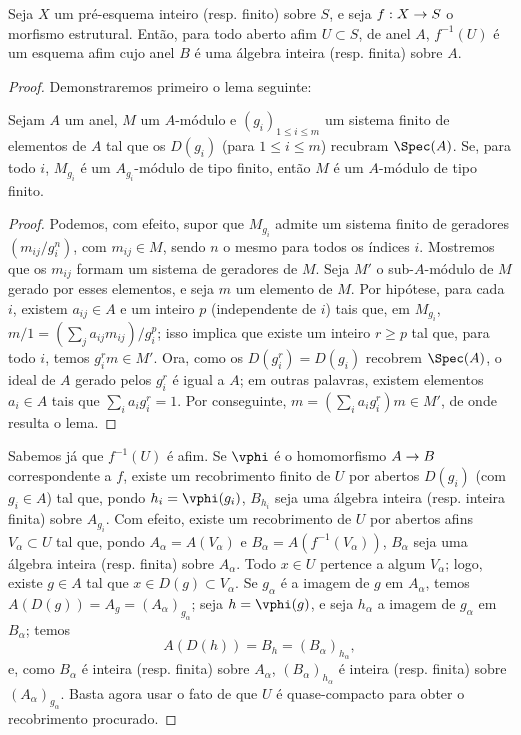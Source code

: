 \documentclass[oneside,10pt]{amsart}
\makeatletter
\renewcommand{\leq}{\leqslant}
\renewcommand{\geq}{\geqslant}
\newcommand{\ega@arrow}[2]{\mathchoice{#1}{#2}{#2}{#2}}
\renewcommand{\to}{\ega@arrow{\longrightarrow}{\rightarrow}}
\newcommand{\oldpage}[2][]{\marginnote{\normalfont\footnotesize\textbf{#1}~|~#2}\ignorespaces}
\let\EGAOriginalLabel\label
\renewcommand{\label}[1]{\phantomsection\EGAOriginalLabel{#1}}
\makeatother
\begin{document}
\begin{proposition}[6.1.4]
\label{II.6.1.4}
Seja $X$ um pré-esquema inteiro (resp. finito) sobre $S$, e seja $f:X\to S$ o morfismo estrutural.
Então, para todo aberto afim $U\subset S$, de anel $A$, $f^{-1}(U)$ é um esquema afim cujo anel $B$ é uma álgebra inteira (resp. finita) sobre $A$.
\end{proposition}
\oldpage[II]{111}
\begin{proof}
Demonstraremos primeiro o lema seguinte:

  \begin{lemma}[6.1.4.1]
  \label{II.6.1.4.1}
  Sejam $A$ um anel, $M$ um $A$-módulo e $(g_i)_{1\leq i\leq m}$ um sistema finito de elementos de $A$ tal que os $D(g_i)$ (para $1\leq i\leq m$) recubram $\Spec(A)$.
  Se, para todo $i$, $M_{g_i}$ é um $A_{g_i}$-módulo de tipo finito, então $M$ é um $A$-módulo de tipo finito.
  \end{lemma}

  \begin{proof}
  Podemos, com efeito, supor que $M_{g_i}$ admite um sistema finito de geradores $(m_{ij}/g_i^n)$, com $m_{ij}\in M$, sendo $n$ o mesmo para todos os índices $i$.
  Mostremos que os $m_{ij}$ formam um sistema de geradores de $M$.
  Seja $M'$ o sub-$A$-módulo de $M$ gerado por esses elementos, e seja $m$ um elemento de $M$.
  Por hipótese, para cada $i$, existem $a_{ij}\in A$ e um inteiro $p$ (independente de $i$) tais que, em $M_{g_i}$, $m/1=(\sum_j a_{ij}m_{ij})/g_i^p$;
  isso implica que existe um inteiro $r\geq p$ tal que, para todo $i$, temos $g_i^rm\in M'$.
  Ora, como os $D(g_i^r)=D(g_i)$ recobrem $\Spec(A)$, o ideal de $A$ gerado pelos $g_i^r$ é igual a $A$; em outras palavras, existem elementos $a_i\in A$ tais que $\sum_i a_ig_i^r=1$.
  Por conseguinte, $m=(\sum_i a_i g_i^r)m\in M'$, de onde resulta o lema.
  \end{proof}

Sabemos já  que $f^{-1}(U)$ é afim.
Se $\vphi$ é o homomorfismo $A\to B$ correspondente a $f$, existe um recobrimento finito de $U$ por abertos $D(g_i)$ (com $g_i\in A$) tal que, pondo $h_i=\vphi(g_i)$, $B_{h_i}$ seja uma álgebra inteira (resp. inteira finita) sobre $A_{g_i}$.
Com efeito, existe um recobrimento de $U$ por abertos afins $V_\alpha\subset U$ tal que, pondo $A_\alpha=A(V_\alpha)$ e $B_\alpha=A(f^{-1}(V_\alpha))$, $B_\alpha$ seja uma álgebra inteira (resp. finita) sobre $A_\alpha$.
Todo $x\in U$ pertence a algum $V_\alpha$; logo, existe $g\in A$ tal que $x\in D(g)\subset V_\alpha$.
Se $g_\alpha$ é a imagem de $g$ em $A_\alpha$, temos $A(D(g))=A_g=(A_\alpha)_{g_\alpha}$;
seja $h=\vphi(g)$, e seja $h_\alpha$ a imagem de $g_\alpha$ em $B_\alpha$;
temos
\[
  A(D(h))=B_h=(B_\alpha)_{h_\alpha},
\]
e, como $B_\alpha$ é inteira (resp. finita) sobre $A_\alpha$, $(B_\alpha)_{h_\alpha}$ é inteira (resp. finita) sobre $(A_\alpha)_{g_\alpha}$.
Basta agora usar o fato de que $U$ é quase-compacto para obter o recobrimento procurado.


\end{proof}
\end{document}
